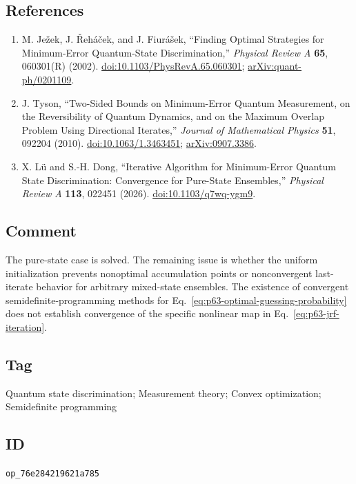 \subsection*{References}

\begin{enumerate}[label={},leftmargin=4.8em,labelsep=0.5em]
  \footnotesize
  \item[\textup{[JRF02]}]\label{ref:p63-jezek-rehacek-fiurasek}
  M. Je\v{z}ek, J. \v{R}eh\'{a}\v{c}ek, and J. Fiur\'{a}\v{s}ek,
  ``Finding Optimal Strategies for Minimum-Error Quantum-State
  Discrimination,'' \emph{Physical Review A} \textbf{65}, 060301(R) (2002).
  \href{https://doi.org/10.1103/PhysRevA.65.060301}%
       {doi:10.1103/PhysRevA.65.060301};
  \href{https://arxiv.org/abs/quant-ph/0201109}%
       {arXiv:quant-ph/0201109}.

  \item[\textup{[Tys10]}]\label{ref:p63-tyson}
  J. Tyson,
  ``Two-Sided Bounds on Minimum-Error Quantum Measurement, on the
  Reversibility of Quantum Dynamics, and on the Maximum Overlap Problem Using
  Directional Iterates,'' \emph{Journal of Mathematical Physics} \textbf{51},
  092204 (2010).
  \href{https://doi.org/10.1063/1.3463451}{doi:10.1063/1.3463451};
  \href{https://arxiv.org/abs/0907.3386}{arXiv:0907.3386}.

  \item[\textup{[LD26]}]\label{ref:p63-lu-dong}
  X. L\"u and S.-H. Dong,
  ``Iterative Algorithm for Minimum-Error Quantum State Discrimination:
  Convergence for Pure-State Ensembles,''
  \emph{Physical Review A} \textbf{113}, 022451 (2026).
  \href{https://doi.org/10.1103/q7wq-ygm9}{doi:10.1103/q7wq-ygm9}.
\end{enumerate}

\subsection*{Comment}

The pure-state case is solved.  The remaining issue is whether the uniform
initialization prevents nonoptimal accumulation points or nonconvergent
last-iterate behavior for arbitrary mixed-state ensembles.  The existence of
convergent semidefinite-programming methods for
Eq.~\eqref{eq:p63-optimal-guessing-probability} does not establish convergence
of the specific nonlinear map in Eq.~\eqref{eq:p63-jrf-iteration}.

\subsection*{Tag}

Quantum state discrimination; Measurement theory; Convex optimization;
Semidefinite programming

\subsection*{ID}

\texttt{op\_76e284219621a785}
